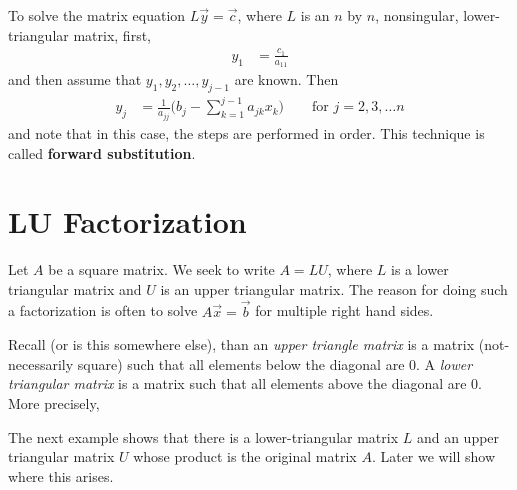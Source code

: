 \begin{Boxed*}
To solve the matrix equation $L\vec{y}=\vec{c}$,  where $L$ is an $n$ by $n$, nonsingular, lower-triangular matrix, first,
\begin{align*}
y_1 & = \frac{c_1}{a_{11}}
\end{align*}
and then assume that $y_1, y_2, \ldots, y_{j-1}$ are known.  Then 
\begin{align*}
y_j & = \frac{1}{a_{jj}} \bigl(b_j - \sum_{k=1}^{j-1} a_{jk} x_k\bigr) \qquad \text{for $j=2,3, \ldots n$} 
\end{align*}
and note that in this case, the steps are performed in order.  This technique is called \textbf{forward substitution}. 
\end{Boxed*}



\section{LU Factorization}

Let $A$ be a square matrix.  We seek to write $A=LU$, where $L$ is a lower triangular matrix and $U$ is an upper triangular matrix.  The reason for doing such a factorization is often to solve $A\vec{x}=\vec{b}$ for multiple right hand sides.   

Recall (or is this somewhere else), than an \emph{upper triangle matrix} is a matrix (not-necessarily square) such that all elements below the diagonal are 0.  A \emph{lower triangular matrix} is a matrix such that all elements above the diagonal are 0.  More precisely,


The next example shows that there is a lower-triangular matrix $L$ and an upper triangular matrix $U$ whose product is the original matrix $A$.  Later we will show where this arises.  


